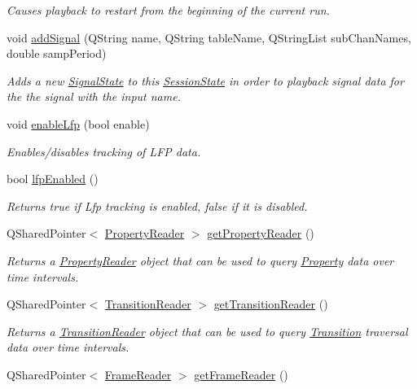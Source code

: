 \begin{DoxyCompactItemize}
\begin{DoxyCompactList}\small\item\em Causes playback to restart from the beginning of the current run. \end{DoxyCompactList}\item 
void \hyperlink{class_picto_1_1_session_state_a7f5f14858c6ff2d727c1ba6017715633}{add\-Signal} (Q\-String name, Q\-String table\-Name, Q\-String\-List sub\-Chan\-Names, double samp\-Period)
\begin{DoxyCompactList}\small\item\em Adds a new \hyperlink{class_picto_1_1_signal_state}{Signal\-State} to this \hyperlink{class_picto_1_1_session_state}{Session\-State} in order to playback signal data for the the signal with the input name. \end{DoxyCompactList}\item 
void \hyperlink{class_picto_1_1_session_state_adbb4217793c27b4adcf2163d9bfa8a88}{enable\-Lfp} (bool enable)
\begin{DoxyCompactList}\small\item\em Enables/disables tracking of L\-F\-P data. \end{DoxyCompactList}\item 
bool \hyperlink{class_picto_1_1_session_state_ace42c529f1217ba8cc1a4e3f585e2f22}{lfp\-Enabled} ()
\begin{DoxyCompactList}\small\item\em Returns true if Lfp tracking is enabled, false if it is disabled. \end{DoxyCompactList}\item 
Q\-Shared\-Pointer$<$ \hyperlink{class_picto_1_1_property_reader}{Property\-Reader} $>$ \hyperlink{class_picto_1_1_session_state_ac75b5c0bd0e2ea0fd106b9bab19d306e}{get\-Property\-Reader} ()
\begin{DoxyCompactList}\small\item\em Returns a \hyperlink{class_picto_1_1_property_reader}{Property\-Reader} object that can be used to query \hyperlink{class_picto_1_1_property}{Property} data over time intervals. \end{DoxyCompactList}\item 
Q\-Shared\-Pointer$<$ \hyperlink{class_picto_1_1_transition_reader}{Transition\-Reader} $>$ \hyperlink{class_picto_1_1_session_state_a39212e2b3c9b1cdf08e1427aa37a80a8}{get\-Transition\-Reader} ()
\begin{DoxyCompactList}\small\item\em Returns a \hyperlink{class_picto_1_1_transition_reader}{Transition\-Reader} object that can be used to query \hyperlink{class_picto_1_1_transition}{Transition} traversal data over time intervals. \end{DoxyCompactList}\item 
\hypertarget{class_picto_1_1_session_state_ab0e3cc01fe71fbbf46f01862b0dce129}{Q\-Shared\-Pointer$<$ \hyperlink{class_picto_1_1_frame_reader}{Frame\-Reader} $>$ \hyperlink{class_picto_1_1_session_state_ab0e3cc01fe71fbbf46f01862b0dce129}{get\-Frame\-Reader} ()}\label{class_picto_1_1_session_state_ab0e3cc01fe71fbbf46f01862b0dce129}


\end{DoxyCompactItemize}
